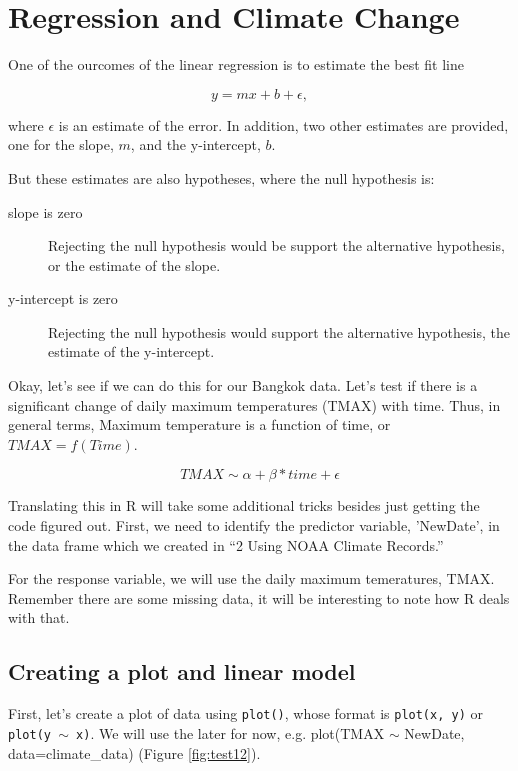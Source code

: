 \documentclass{article}\usepackage[]{graphicx}\usepackage[]{color}
\begin{document}
\section{Regression and Climate Change}

One of the ourcomes of the linear regression is to estimate the best fit line

\begin{equation}
y = mx + b + \epsilon,
\end{equation}

where $\epsilon$ is an estimate of the error. In addition, two other estimates are provided, one for the slope, $m$, and the y-intercept, $b$. 

But these estimates are also hypotheses, where the null hypothesis is:

\begin{description}
  \item[slope is zero] Rejecting the null hypothesis would be support the alternative hypothesis, or the estimate of the slope. 
  \item[y-intercept is zero] Rejecting the null hypothesis would support the alternative hypothesis, the estimate of the y-intercept.
\end{description}

Okay, let's see if we can do this for our Bangkok data. Let's test if there is a significant change of daily maximum temperatures (TMAX) with time. Thus, in general terms, Maximum temperature is a function of time, or $TMAX = f(Time)$. 

\begin{equation}
TMAX \sim \alpha + \beta * time + \epsilon
\end{equation}

Translating this in R will take some additional tricks besides just getting the code figured out. First, we need to identify the predictor variable, 'NewDate', in the data frame which we created in ``2 Using NOAA Climate Records.'' 

For the response variable, we will use the daily maximum temeratures, TMAX. Remember there are some missing data, it will be interesting to note how R deals with that.

\subsection{Creating a plot and linear model}

First, let's create a plot of data using \texttt{plot()}, whose format is \texttt{plot(x, y)} or \texttt{plot(y $\sim$ x)}. We will use the later for now, e.g. plot(TMAX $\sim$ NewDate, data=climate\_data) (Figure \ref{fig:test12}).
\end{document}
